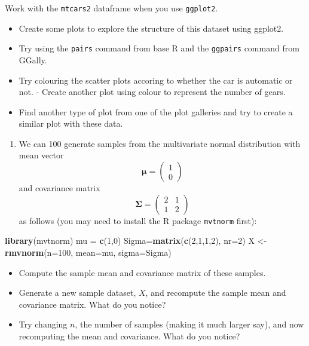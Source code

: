 \documentclass[
]{book}
\newenvironment{Shaded}{\begin{snugshade}}{\end{snugshade}}
\newcommand{\AttributeTok}[1]{\textcolor[rgb]{0.13,0.29,0.53}{#1}}
\newcommand{\DecValTok}[1]{\textcolor[rgb]{0.00,0.00,0.81}{#1}}
\newcommand{\FunctionTok}[1]{\textcolor[rgb]{0.13,0.29,0.53}{\textbf{#1}}}
\newcommand{\NormalTok}[1]{#1}
\newcommand{\OtherTok}[1]{\textcolor[rgb]{0.56,0.35,0.01}{#1}}
\providecommand{\tightlist}{%
  \setlength{\itemsep}{0pt}\setlength{\parskip}{0pt}}
\theoremstyle{definition}
\theoremstyle{definition}
\theoremstyle{definition}
\theoremstyle{definition}
\theoremstyle{remark}
\begin{document}
Work with the \texttt{mtcars2} dataframe when you use \texttt{ggplot2}.

\begin{itemize}
\tightlist
\item
  Create some plots to explore the structure of this dataset using ggplot2.
\item
  Try using the \texttt{pairs} command from base R and the \texttt{ggpairs} command from GGally.
\item
  Try colouring the scatter plots accoring to whether the car is automatic or not. - Create another plot using colour to represent the number of gears.
\item
  Find another type of plot from one of the plot galleries and try to create a similar plot with these data.
\end{itemize}

\begin{enumerate}
\def\labelenumi{\arabic{enumi}.}
\setcounter{enumi}{3}
\tightlist
\item
  We can 100 generate samples from the multivariate normal distribution with mean vector
  \[{\boldsymbol{\mu}}= \left(\begin{array}{c}1\\0\end{array}\right)\]
  and covariance matrix
  \[\boldsymbol{\Sigma}= \left(\begin{array}{cc}2&1\\1&2\end{array}\right)\]
  as follows (you may need to install the R package \texttt{mvtnorm} first):
\end{enumerate}

\begin{Shaded}
\begin{Highlighting}[]
\FunctionTok{library}\NormalTok{(mvtnorm)}
\NormalTok{mu }\OtherTok{=} \FunctionTok{c}\NormalTok{(}\DecValTok{1}\NormalTok{,}\DecValTok{0}\NormalTok{)}
\NormalTok{Sigma}\OtherTok{=}\FunctionTok{matrix}\NormalTok{(}\FunctionTok{c}\NormalTok{(}\DecValTok{2}\NormalTok{,}\DecValTok{1}\NormalTok{,}\DecValTok{1}\NormalTok{,}\DecValTok{2}\NormalTok{), }\AttributeTok{nr=}\DecValTok{2}\NormalTok{)}
\NormalTok{X }\OtherTok{\textless{}{-}} \FunctionTok{rmvnorm}\NormalTok{(}\AttributeTok{n=}\DecValTok{100}\NormalTok{, }\AttributeTok{mean=}\NormalTok{mu, }\AttributeTok{sigma=}\NormalTok{Sigma)}
\end{Highlighting}
\end{Shaded}

\begin{itemize}
\tightlist
\item
  Compute the sample mean and covariance matrix of these samples.
\item
  Generate a new sample dataset, \(X\), and recompute the sample mean and covariance matrix. What do you notice?
\item
  Try changing \(n\), the number of samples (making it much larger say), and now recomputing the mean and covariance. What do you notice?
\end{itemize}
\end{document}
